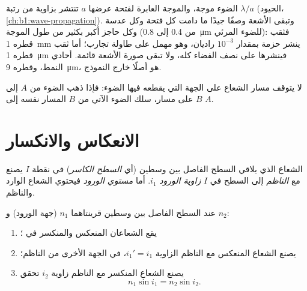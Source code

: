 \begin{remark}\label{rem:b1:rays-reflection-refraction:limits}
الضوء موجة، والموجة العابرة لفتحة عرضها $a$ تنتشر بزاوية من رتبة
$\lambda/a$ (الحيود، \cref{ch:b1:wave-propagation}). وتبقى الأشعة
وصفًا جيدًا ما دامت كل فتحة وكل عدسة وكل حاجز أكبر بكثير من طول الموجة
(من \qty{0.4}{} إلى \qty{0.8}{\micro m} للضوء المرئي): فثقب قطره
\qty{1}{mm} ينشر حزمة بمقدار $10^{-3}$ راديان، وهو مهمل على طاولة
تجارب؛ أما ثقب قطره \qty{1}{\micro m} فينشرها على نصف الفضاء كله، ولا
تبقى صورة الأشعة قائمة.   أحادي النمط، وقطره
\qty{9}{\micro m}، هو أصلًا خارج النموذج.
\end{remark}

\begin{proposition}\label{prop:b1:rays-reflection-refraction:reversibility}
لا يتوقف مسار الشعاع على الجهة التي يقطعه فيها الضوء: فإذا ذهب الضوء
من $A$ إلى $B$ على مسار، سلك الضوء الآتي من $B$ المسار نفسه إلى $A$.
\end{proposition}
\admitted

\section{الانعكاس والانكسار}

\begin{definition}[الورود]\label{def:b1:rays-reflection-refraction:incidence}
الشعاع الذي يلاقي السطح الفاصل بين وسطين (أي \emph{السطح الكاسر}) في
نقطة $I$ يصنع مع \emph{الناظم} إلى السطح في $I$
\emph{زاوية الورود} $i_1$. أما \emph{مستوي الورود} فيحتوي الشعاع
الوارد والناظم.
\end{definition}

\begin{theorem}\label{thm:b1:rays-reflection-refraction:snell}
عند السطح الفاصل بين وسطين قرينتاهما $n_1$ (جهة الورود) و
$n_2$:
\begin{enumerate}
  \item يقع الشعاعان المنعكس والمنكسر في ؛
  \item يصنع الشعاع المنعكس مع الناظم الزاوية $i_1' = i_1$،
        في الجهة الأخرى من الناظم؛
  \item يصنع الشعاع المنكسر مع الناظم زاوية $i_2$ تحقق
        \[
        n_1 \sin i_1 = n_2 \sin i_2 .
        \]
\end{enumerate}
\end{theorem}
\admitted

